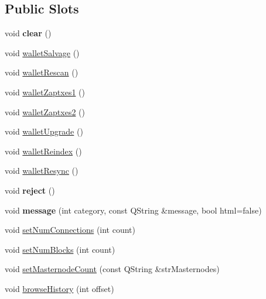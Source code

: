 \subsection*{Public Slots}
\begin{DoxyCompactItemize}
\item 
\mbox{\label{class_r_p_c_console_aad0fc48b238137c8f6d322b2a484c81a}} 
void {\bfseries clear} ()
\item 
void \mbox{\hyperlink{class_r_p_c_console_ad272e3e402b452d470e5d0cc22dfa838}{wallet\+Salvage}} ()
\item 
void \mbox{\hyperlink{class_r_p_c_console_a87bca6ab058743cda3d716543071ce03}{wallet\+Rescan}} ()
\item 
void \mbox{\hyperlink{class_r_p_c_console_ab99e8a7e0a6164126aa18c59827722d5}{wallet\+Zaptxes1}} ()
\item 
void \mbox{\hyperlink{class_r_p_c_console_ab96912afa85d43a67a4db4869faccdd9}{wallet\+Zaptxes2}} ()
\item 
void \mbox{\hyperlink{class_r_p_c_console_a5ba9075f3f7dad2e84302ea3da9f51af}{wallet\+Upgrade}} ()
\item 
void \mbox{\hyperlink{class_r_p_c_console_ac0e0d64fc96a4621dcb8006eafbb3bc5}{wallet\+Reindex}} ()
\item 
void \mbox{\hyperlink{class_r_p_c_console_a32940def4bbbe99bebd243bace2101da}{wallet\+Resync}} ()
\item 
\mbox{\label{class_r_p_c_console_a9efe36637f7b615f63f2886ba555d49a}} 
void {\bfseries reject} ()
\item 
\mbox{\label{class_r_p_c_console_ad7a93a587a78b0080a930bd325460b20}} 
void {\bfseries message} (int category, const Q\+String \&message, bool html=false)
\item 
void \mbox{\hyperlink{class_r_p_c_console_aa4546cb7812dd35704de8bf09a6ceb60}{set\+Num\+Connections}} (int count)
\item 
void \mbox{\hyperlink{class_r_p_c_console_a98b7e85774a91d77c3b01276bd41bc51}{set\+Num\+Blocks}} (int count)
\item 
void \mbox{\hyperlink{class_r_p_c_console_a23a841c2142f7ac49506099334135cf5}{set\+Masternode\+Count}} (const Q\+String \&str\+Masternodes)
\item 
void \mbox{\hyperlink{class_r_p_c_console_a1c2ccbaedfeb8ed8cd3f73307a38bd7f}{browse\+History}} (int offset)

\end{DoxyCompactItemize}
